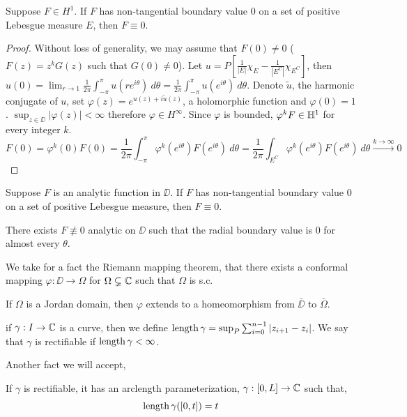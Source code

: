 \begin{theorem}
	Suppose $F \in H^1$. If $F$ has non-tangential boundary value $0$ on a set of positive Lebesgue measure $E$, then $F \equiv 0$.
\end{theorem}
\begin{proof}
	Without loss of generality, we may assume that $F(0) \ne 0$ ($F(z) = z^k G(z)$ such that $G(0) \ne 0$).
	Let $u = P[\frac{1}{|E|} \chi_E - \frac{1}{|E^C|} \chi_{E^C}]$, then $u(0) = \lim_{r \to 1} \frac{1}{2 \pi} \int_{-\pi}^{\pi} u(r e^{i \theta})\ d \theta = \frac{1}{2 \pi} \int_{-\pi}^{\pi} u(e^{i \theta})\ d \theta$.
	Denote $\tilde{u}$, the harmonic conjugate of $u$, set $\varphi(z) = e^{u(z) + i \tilde{u}(z)}$, a holomorphic function and $\varphi(0) = 1$.
	$\sup_{z \in \DD} |\varphi(z)| < \infty$ therefore $\varphi \in H^\infty$.
	Since $\varphi$ is bounded, $\varphi^k F \in \mathbb{H}^1$ for every integer $k$.
	\[
		F(0)
		= \varphi^k(0) F(0)
		= \frac{1}{2 \pi} \int_{-\pi}^{\pi} \varphi^k(e^{i \theta}) F(e^{i \theta})\ d \theta
		= \frac{1}{2 \pi} \int_{E^C} \varphi^k(e^{i \theta}) F(e^{i \theta})\ d \theta
		\xrightarrow{k \to \infty} 0
	\]
\end{proof}
\begin{theorem}[Privalov]
	Suppose $F$ is an analytic function in $\DD$.
	If $F$ has non-tangential boundary value $0$ on a set of positive Lebesgue measure, then $F \equiv 0$.
\end{theorem}
\begin{remark}
	There exists $F \not\equiv 0$ analytic on $\DD$ such that the radial boundary value is $0$ for almost every $\theta$.
\end{remark}
We take for a fact the Riemann mapping theorem, that there exists a conformal mapping $\varphi : \DD \to \Omega$ for $\Omega \subsetneq \mathbb{C}$ such that $\Omega$ is s.c.
\begin{theorem}[Carathéodory]
	If $\Omega$ is a Jordan domain, then $\varphi$ extends to a homeomorphism from $\bar{\DD}$ to $\bar{\Omega}$.
\end{theorem}
\begin{definition}
	if $\gamma : I \to \mathbb{C}$ is a curve, then we define $\operatorname{length} \gamma = \sup_P \sum_{i = 0}^{n - 1} |z_{i + 1} - z_i|$.
	We say that $\gamma$ is rectifiable if $\operatorname{length} \gamma < \infty$.
\end{definition}
Another fact we will accept,
\begin{proposition}
	If $\gamma$ is rectifiable, it has an arclength parameterization, $\gamma : [0, L] \to \mathbb{C}$ such that,
	\[
		\operatorname{length} \gamma([0, t])
		= t
	\]
\end{proposition}
